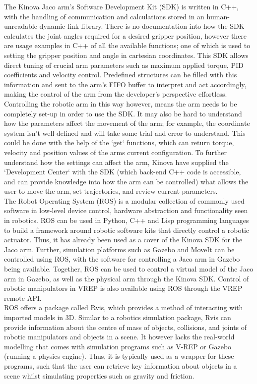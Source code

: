 \documentclass[12pt,openany,a4paper]{book}
\begin{document}
The Kinova Jaco arm's Software Development Kit (SDK) is written in C++, with the handling of communication and calculations stored in an human-unreadable dynamic link library. There is no documentation into how the SDK calculates the joint angles required for a desired gripper position, however there are usage examples in C++ of all the available functions; one of which is used to setting the gripper position and angle in cartesian coordinates. This SDK allows direct tuning of crucial arm parameters such as maximum applied torque, PID coefficients and velocity control. Predefined structures can be filled with this information and sent to the arm's FIFO buffer to interpret and act accordingly, making the control of the arm from the developer's perspective effortless.\\
Controlling the robotic arm in this way however, means the arm needs to be completely set-up in order to use the SDK. It may also be hard to understand how the parameters affect the movement of the arm; for example, the coordinate system isn't well defined and will take some trial and error to understand. This could be done with the help of the `get` functions, which can return torque, velocity and position values of the arms current configuration. To further understand how the settings can affect the arm, Kinova have supplied the `Development Center` with the SDK (which back-end C++ code is accessible, and can provide knowledge into how the arm can be controlled) what allows the user to move the arm, set trajectories, and review current parameters.\\



The Robot Operating System (ROS) is a modular collection of commonly used software in low-level device control, hardware abstraction and functionality seen in robotics. ROS can be used in Python, C++ and Lisp programming languages to build a framework around robotic software kits that directly control a robotic actuator. Thus, it has already been used as a cover of the Kinova SDK for the Jaco arm. Further, simulation platforms such as Gazebo and MoveIt can be controlled using ROS, with the software for controlling a Jaco arm in Gazebo being available. Together, ROS can be used to control a virtual model of the Jaco arm in Gazebo, as well as the physical arm through the Kinova SDK. Control of robotic manipulators in VREP is also available using ROS through the VREP remote API.\\
ROS offers a package called Rvis, which provides a method of interacting with imported models in 3D. Similar to a robotics simulation package, Rvis can provide information about the centre of mass of objects, collisions, and joints of robotic manipulators and objects in a scene. It however lacks the real-world modelling that comes with simulation programs such as V-REP or Gazebo (running a physics engine). Thus, it is typically used as a wrapper for these programs, such that the user can retrieve key information about objects in a scene whilst simulating properties such as gravity and friction.
\end{document}
